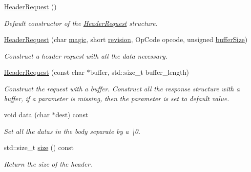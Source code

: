 \begin{DoxyCompactItemize}
\item 
\mbox{\label{structprotocol_1_1serialize_1_1_header_request_a5198046f6e2c71335405c52dfd4fe7e7}} 
\hyperlink{structprotocol_1_1serialize_1_1_header_request_a5198046f6e2c71335405c52dfd4fe7e7}{Header\+Request} ()
\begin{DoxyCompactList}\small\item\em Default constructor of the \hyperlink{structprotocol_1_1serialize_1_1_header_request}{Header\+Request} structure. \end{DoxyCompactList}\item 
\hyperlink{structprotocol_1_1serialize_1_1_header_request_a3dfea4cb729e593117ce9f8d5a851ef6}{Header\+Request} (char \hyperlink{structprotocol_1_1serialize_1_1_header_request_ab7c26d951ffb1bbac4622ac5a9f9dbc1}{magic}, short \hyperlink{structprotocol_1_1serialize_1_1_header_request_a9b10c7ac55252322b71c9720854d8d5a}{revision}, Op\+Code opcode, unsigned \hyperlink{structprotocol_1_1serialize_1_1_header_request_a60ceae16d905c732b6b307d09012f935}{buffer\+Size})
\begin{DoxyCompactList}\small\item\em Construct a header request with all the data necessary. \end{DoxyCompactList}\item 
\hyperlink{structprotocol_1_1serialize_1_1_header_request_ac9b9387810ae483a9ffa815ecfa158e3}{Header\+Request} (const char $\ast$buffer, std\+::size\+\_\+t buffer\+\_\+length)
\begin{DoxyCompactList}\small\item\em Construct the request with a buffer. Construct all the response structure with a buffer, if a parameter is missing, then the parameter is set to default value. \end{DoxyCompactList}\item 
void \hyperlink{structprotocol_1_1serialize_1_1_header_request_a1088cd1ac3338dd42e3a6929c9e5b5bf}{data} (char $\ast$dest) const
\begin{DoxyCompactList}\small\item\em Set all the datas in the body separate by a \textbackslash{}0. \end{DoxyCompactList}\item 
\mbox{\label{structprotocol_1_1serialize_1_1_header_request_a8d8850de2897540368d342a33ae748ad}} 
std\+::size\+\_\+t \hyperlink{structprotocol_1_1serialize_1_1_header_request_a8d8850de2897540368d342a33ae748ad}{size} () const
\begin{DoxyCompactList}\small\item\em Return the size of the header. \end{DoxyCompactList}\end{DoxyCompactItemize}
